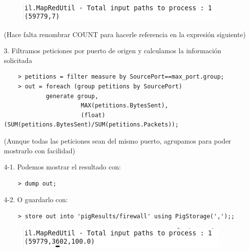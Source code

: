 \documentclass[13pt,a4paper]{article}
\begin{document}
\vspace{\baselineskip}

\begin{figure}[H]\center\includegraphics[width=.65\linewidth]{img/1.png}\end{figure}

(Hace falta renombrar COUNT para hacerle referencia en la expresión siguiente)

\newpage

3. Filtramos peticiones por puerto de origen y calculamos la información solicitada
\begin{lstlisting}
    > petitions = filter measure by SourcePort==max_port.group;
    > out = foreach (group petitions by SourcePort) 
            generate group, 
                      MAX(petitions.BytesSent), 
                      (float)(SUM(petitions.BytesSent)/SUM(petitions.Packets));
\end{lstlisting}

\vspace{\baselineskip}

(Aunque todas las peticiones sean del mismo puerto, agrupamos para poder mostrarlo con facilidad)

\vspace{\baselineskip}

4-1. Podemos mostrar el resultado con:
\begin{lstlisting}
    > dump out;
\end{lstlisting}

\vspace{\baselineskip}

4-2. O guardarlo con:
\begin{lstlisting}
    > store out into 'pigResults/firewall' using PigStorage(',');;
\end{lstlisting}

\begin{figure}[H]\center\includegraphics[width=.95\linewidth]{img/2.png}\end{figure}

    \setlength{\parskip}{1em}
    
    
    \newpage
\end{document}
